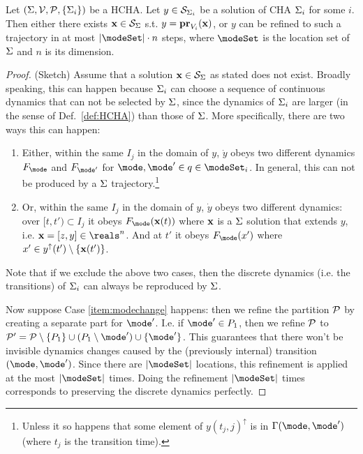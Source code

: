 
\begin{thm}
	Let $(\Sigma,\mathcal{V},\mathcal{P},\{\Sigma_i\})$ be a HCHA.
	Let $y \in \mathcal{S}_{\Sigma_i}$ be a solution of CHA $\Sigma_i$ for some $i$.
	Then either there exists $\mathbf{x} \in \mathcal{S}_\Sigma$ s.t. $y = {\bf pr}_{V_i}(\mathbf{x})$,
	or $y$ can be refined to such a trajectory in at most $|\modeSet|\cdot n$ steps,
	where $\modeSet$ is the location set of $\Sigma$ and $n$ is its dimension.
\end{thm}

\begin{proof} (Sketch)
	Assume that a solution $\mathbf{x} \in \mathcal{S}_\Sigma$ as stated does not exist.
	Broadly speaking, this can happen because $\Sigma_i$ can choose a sequence of continuous dynamics that can not be selected by $\Sigma$, since the dynamics of $\Sigma_i$ are larger (in the sense of Def.~\ref{def:HCHA}) than those of $\Sigma$.
	More specifically, there are two ways this can happen:
	\begin{enumerate}
		\item Either, within the same $I_j$ in the domain of $y$, $\dot{y}$ obeys two different dynamics $F_\mode$ and $F_{\mode'}$ for $\mode,\mode' \in q \in \modeSet_i$.
		In general, this can not be produced by a $\Sigma$ trajectory.\footnote{Unless it so happens that some element of $y(t_j,j)^{\uparrow}$ is in $\guard(\mode,\mode')$ (where $t_j$ is the transition time). }
		\label{item:modechange}
		\item Or, within the same $I_j$ in the domain of $y$, $\dot{y}$ obeys two different dynamics: 
		over $[t,t') \subset I_j$ it obeys $F_\mode(\sttraj(t))$ where $\mathbf{x}$ is a $\Sigma$ solution that extends $y$, i.e. $\sttraj = [z,y] \in \reals^n$.
		And at $t'$ it obeys $F_\mode(x')$ where $x' \in y^\uparrow(t') \setminus \{\mathbf{x}(t')\}$. 
		\label{item:xchange}		
	\end{enumerate}
	
	Note that if we exclude the above two cases, then the discrete dynamics (i.e. the transitions) of $\Sigma_i$ can always be reproduced by $\Sigma$.
	
	Now suppose Case \ref{item:modechange} happens: then we refine the partition $\mathcal{P}$ by creating a separate part for $\mode'$. I.e. if $\mode' \in P_1$, then we refine $\mathcal{P}$ to 
	$\Pc' = \Pc \setminus \{P_1\} \cup (P_1 \setminus \mode') \cup \{\mode'\}$.
	This guarantees that there won't be invisible dynamics changes caused by the (previously internal) transition $(\mode,\mode')$.
	Since there are $|\modeSet|$ locations, this refinement is applied at the most $|\modeSet|$ times.
	Doing the refinement $|\modeSet|$ times corresponds to preserving the discrete dynamics perfectly.
	

\end{proof}
